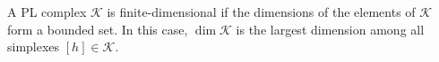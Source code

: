 A PL complex $\mathcal{K}$ is finite-dimensional if the dimensions of the elements of $\mathcal{K}$ form a bounded set. In this case, $\dim \mathcal{K}$ is the largest dimension among all simplexes $[h] \in \mathcal{K}$.
